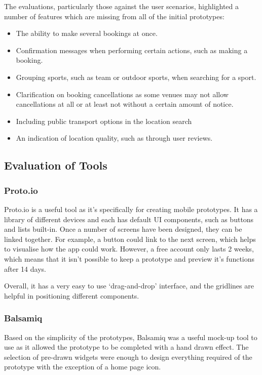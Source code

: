 The evaluations, particularly those against the user scenarios, highlighted a
number of features which are missing from all of the initial prototypes:

\begin{itemize}
	\item The ability to make several bookings at once.
	\item Confirmation messages when performing certain actions, such as making
		a booking.
	\item Grouping sports, such as team or outdoor sports, when searching for a
		sport.
	\item Clarification on booking cancellations as some venues may not allow
		cancellations at all or at least not without a certain amount of
		notice.
	\item Including public transport options in the location search
	\item An indication of location quality, such as through user reviews.
\end{itemize}

\subsection{Evaluation of Tools}

\subsubsection{Proto.io}

Proto.io\cite{protoio} is a useful tool as it's specifically for creating
mobile prototypes.  It has a library of different devices and each has default
UI components, such as buttons and lists built-in. Once a number of screens
have been designed, they can be linked together. For example, a button could
link to the next screen, which helps to visualise how the app could work.
However, a free account only lasts 2 weeks, which means that it isn’t possible
to keep a prototype and preview it’s functions after 14 days.

Overall, it has a very easy to use `drag-and-drop' interface, and the gridlines
are helpful in positioning different components.

\subsubsection{Balsamiq}

Based on the simplicity of the prototypes, Balsamiq\cite{balsamiq} was a useful
mock-up tool to use as it allowed the prototype to be completed with a hand
drawn effect.  The selection of pre-drawn widgets were enough to design
everything required of the prototype with the exception of a home page icon.

